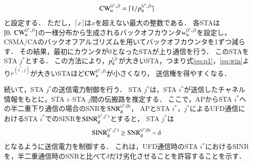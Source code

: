 \documentclass[master]{kuisthesis}		%
\begin{document}
			\begin{equation}
				{\rm CW}^{(i^*,j)}_{\rm u} = \lceil 1/p_{\rm u}^{(i^*,j)} \rceil
			\end{equation}
			と設定する．
			ただし，$\lceil x \rceil$は$x$を超えない最大の整数である．
			各STAは$[0,\ {\rm CW}^{(i^*,j)}_{\rm u}]$の一様分布から生成されるバックオフカウンタ$w_{\rm u}^{(i^*,j)}$を設定し，
			CSMA/CAのバックオフアルゴリズムを用いてバックオフカウンタを1ずつ減らす．
			その結果，最初にカウンタが0となったSTAが上り通信を行う．
			このSTAをSTA $j^*$とする．
			この方法により，$p_{\rm u}^{(j)}$が大きいSTA，つまり式\eqref{eq:p1}，\eqref{eq:win}より$r^{(i^*,j)}$が大きいSTAほど${\rm CW}^{(i^*,j)}_{\rm u}$が小さくなり，
			送信権を得やすくなる．
			\par
			続いて，STA $j^*$の送信電力制御を行う．
			STA $j^*$は，STA $i^*$が送信したチャネル情報をもとに，STA $i$--STA $j$間の伝搬路を推定する．
			ここで，APからSTA $i^*$への半二重下り通信の場合のSNRを${\rm SNR}_{\rm d}^{(i^*,0)}$，
			APとSTA $i^*$，$j^*$によるUFD通信におけるSTA $i^*$でのSINRを${\rm SINR}_{\rm d}^{(i^*,j^*)}$とすると，
			STA $j^*$は
			\begin{equation}
				{\rm SINR}_{\rm d}^{(i^*,j^*)} \geq {\rm SNR}_{\rm d}^{(i^*,0)} -\delta
			\end{equation}
			となるように送信電力を制御する．
			これは，UFD通信時のSTA $i^*$におけるSINRを，半二重通信時のSNRと比べて$\delta$だけ劣化させることを許容することを示す．
\end{document}
